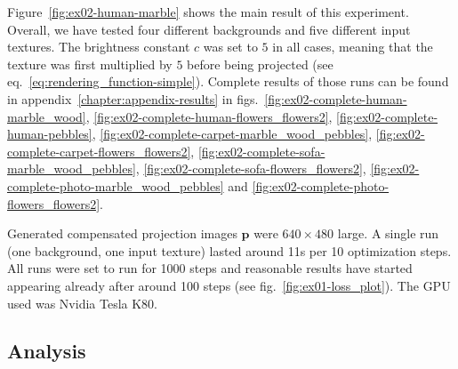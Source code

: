 Figure~\ref{fig:ex02-human-marble} shows the main result of this experiment. Overall, we have tested four different backgrounds and five different input textures. The brightness constant \(c\) was set to \(5\) in all cases, meaning that the texture was first multiplied by \(5\) before being projected (see eq.~\ref{eq:rendering_function-simple}). Complete results of those runs can be found in appendix~\ref{chapter:appendix-results} in figs.~\ref{fig:ex02-complete-human-marble_wood}, \ref{fig:ex02-complete-human-flowers_flowers2}, \ref{fig:ex02-complete-human-pebbles}, \ref{fig:ex02-complete-carpet-marble_wood_pebbles}, \ref{fig:ex02-complete-carpet-flowers_flowers2}, \ref{fig:ex02-complete-sofa-marble_wood_pebbles}, \ref{fig:ex02-complete-sofa-flowers_flowers2}, \ref{fig:ex02-complete-photo-marble_wood_pebbles} and \ref{fig:ex02-complete-photo-flowers_flowers2}.

Generated compensated projection images \(\bm{p}\) were \(640 \times 480\) large. A single run (one background, one input texture) lasted around 11s per 10 optimization steps. All runs were set to run for 1000 steps and reasonable results have started appearing already after around 100 steps (see fig.~\ref{fig:ex01-loss_plot}). The GPU used was Nvidia Tesla K80.

\subsection{Analysis}
\label{section:results-experiments-02-analysis}

